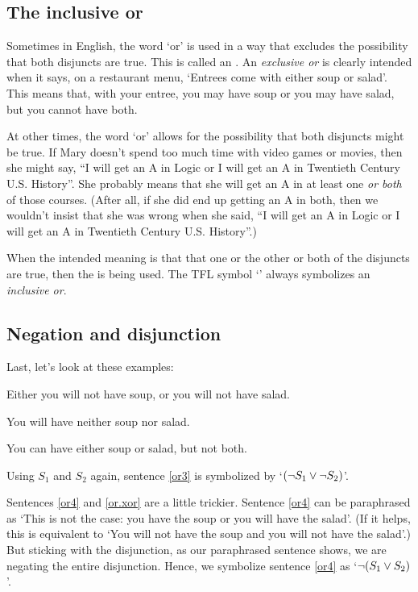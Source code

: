 \subsection{The inclusive or}

Sometimes in English, the word `or' is used in a way that excludes the possibility that both disjuncts are true. This is called an .  An \emph{exclusive or} is clearly intended when it says, on a restaurant menu, `Entrees come with either soup or salad'. This means that, with your entree, you may have soup or you may have salad, but you cannot have both.

At other times, the word `or' allows for the possibility that both disjuncts might be true. If Mary doesn't spend too much time with video games or movies, then she might say, ``I will get an A in Logic or I will get an A in Twentieth Century U.S. History''. She probably means that she will get an A in at least one \textit{or both} of those courses. (After all, if she did end up getting an A in both, then we wouldn't insist that she was wrong when she said, ``I will get an A in Logic or I will get an A in Twentieth Century U.S. History''.)

When the intended meaning is that that one or the other or both of the disjuncts are true, then the  is being used. The TFL symbol `\eor' always symbolizes an \emph{inclusive or}.

\subsection{Negation and disjunction}

Last, let's look at these examples:
	\begin{earg}
		\item[\ex{or3}] Either you will not have soup, or you will not have salad.
		\item[\ex{or4}] You will have neither soup nor salad.
		\item[\ex{or.xor}] You can have either soup or salad, but not both.
	\end{earg}
Using $S_1$ and $S_2$ again, sentence \ref{or3} is symbolized by `$({\neg} S_1 \vee {\neg} S_2)$'.

Sentences \ref{or4} and \ref{or.xor} are a little trickier. Sentence \ref{or4} can be paraphrased as `This is not the case: you have the soup or you will have the salad'. (If it helps, this is equivalent to `You will not have the soup and you will not have the salad'.) But sticking with the disjunction, as our paraphrased sentence shows, we are negating the entire disjunction. Hence, we symbolize sentence \ref{or4} as `${\neg} (S_1 \vee S_2)$'. 

